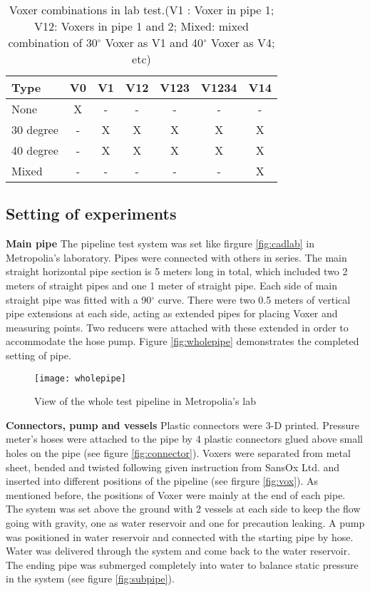 \begin{table}[h]
  \centering
  \caption{Voxer combinations in lab test.\newline (V1 : Voxer in pipe 1; V12: Voxers in pipe 1 and 2; Mixed: mixed combination of 30$^{\circ}$ Voxer as  V1 and 40$^{\circ}$ Voxer as V4; etc)}
  \begin{tabular}{l*{6}{c}}
Type             & V0 & V1 & V12 & V123 & V1234 & V14 \\
\hline
None & X & - & - & - & - & -   \\
30 degree           & - & X & X & X &  X & X  \\
40 degree           & - & X & X & X &  X & X   \\
Mixed     & - & - & - & - & - & X   \\
\end{tabular}
  \label{table:combi}
\end{table}

\subsection{Setting of experiments}

\textbf{Main pipe} \newline
The pipeline test system was set like firgure \vref{fig:cadlab} in Metropolia’s laboratory.  Pipes were connected with others in series. The main straight horizontal pipe section is 5 meters long in total, which included two 2 meters of straight pipes and one 1 meter of straight pipe. Each side of main straight pipe was fitted with a 90$^{\circ}$ curve. There were two 0.5 meters of vertical pipe extensions at each side, acting as extended pipes for placing Voxer and measuring points. Two reducers were attached with these extended in order to accommodate the hose pump. Figure \vref{fig:wholepipe} demonstrates the completed setting of pipe.

\begin{figure}[h]
  \centering
  \texttt{[image: wholepipe]}
  \caption{View of the whole test pipeline in Metropolia's lab }
  \label{fig:wholepipe}
\end{figure}

\textbf{Connectors, pump and vessels}\newline
Plastic connectors were 3-D printed. Pressure meter’s hoses were attached to the pipe by 4 plastic connectors glued above small holes on the pipe (see figure \vref{fig:connector}). Voxers were separated from metal sheet, bended and twisted following given instruction from SansOx Ltd. and inserted into different positions of the pipeline (see firgure \vref{fig:vox}). As mentioned before, the positions of Voxer were mainly at the end of each pipe. The system was set above the ground with 2 vessels at each side to keep the flow going with gravity, one as water reservoir and one for precaution leaking. A pump was positioned in water reservoir and connected with the starting pipe by hose. Water was delivered through the system and come back to the water reservoir. The ending pipe was submerged completely into water to balance static pressure in the system (see figure \ref{fig:subpipe}).

